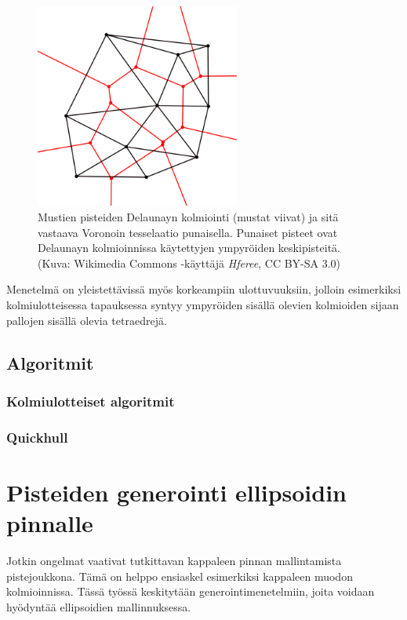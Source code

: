 \documentclass[12pt,a4paper,titlepage]{article}
\begin{document}
\begin{figure}
  \centering
  \includegraphics[width=0.6\textwidth]{kuvat/voronoi.png}
  \caption{Mustien pisteiden Delaunayn kolmiointi (mustat viivat) ja sitä vastaava Voronoin tesselaatio punaisella. Punaiset pisteet ovat Delaunayn kolmioinnissa käytettyjen ympyröiden keskipisteitä. (Kuva: Wikimedia Commons -käyttäjä \textit{Hferee}, CC BY-SA 3.0)}
  \label{voronoi}
\end{figure}

Menetelmä on yleistettävissä myös korkeampiin ulottuvuuksiin, jolloin esimerkiksi kolmiulotteisessa tapauksessa syntyy ympyröiden sisällä olevien kolmioiden sijaan pallojen sisällä olevia tetraedrejä. \cite{maur2002delaunay}

\subsection{Algoritmit}

\subsubsection{Kolmiulotteiset algoritmit}

\subsubsection{Quickhull}

\section{Pisteiden generointi ellipsoidin pinnalle}
Jotkin ongelmat vaativat tutkittavan kappaleen pinnan mallintamista pistejoukkona. Tämä on helppo ensiaskel esimerkiksi kappaleen muodon kolmioinnissa. Tässä työssä keskitytään generointimenetelmiin, joita voidaan hyödyntää ellipsoidien mallinnuksessa.
\end{document}
